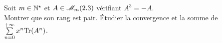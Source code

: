 \begin{exercice}
    Soit $m \in \mathbb{N}^\star$ et $A \in \mathscr{M}_m(2.3)$ vérifiant $A^3=-A$.\\
    Montrer que son rang est pair. Étudier la convergence et la somme de $\sum\limits_{n=0}^{+\infty} x^n \mathrm{Tr} (A^n)$.
\end{exercice}
